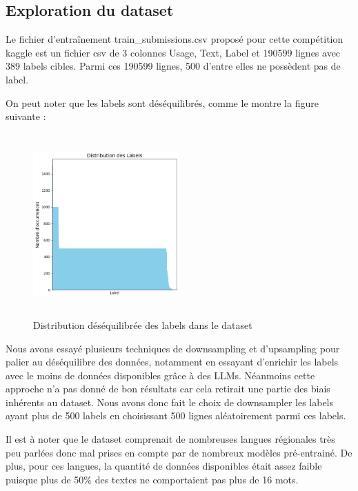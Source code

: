 \subsection{Exploration du dataset}

Le fichier d'entraînement train\_submissions.csv proposé pour cette compétition kaggle est un fichier csv de 3 colonnes Usage, Text, Label et 190599 lignes avec 389 labels cibles. Parmi ces 190599 lignes, 500 d'entre elles ne possèdent pas de label. 

On peut noter que les labels sont déséquilibrés, comme le montre la figure suivante :

\begin{figure}[h!]
    \centering
    \includegraphics[width=0.5\textwidth, height=7cm]{img/unbalance.png}
    \caption{Distribution déséquilibrée des labels dans le dataset}
    \label{fig:unbalance}
\end{figure}

Nous avons essayé plusieurs techniques de downsampling et d'upsampling pour palier au déséquilibre des données, notamment en essayant d'enrichir les labels avec le moins de données disponibles grâce à des LLMs. Néanmoins cette approche n'a pas donné de bon résultats car cela retirait une partie des biais inhérents au dataset. Nous avons donc fait le choix de downsampler les labels ayant plus de 500 labels en choisissant 500 lignes aléatoirement parmi ces labels.

Il est à noter que le dataset comprenait de nombreuses langues régionales très peu parlées donc mal prises en compte par de nombreux modèles pré-entrainé. De plus, pour ces langues, la quantité de données disponibles était assez faible puisque plus de 50\% des textes ne comportaient pas plus de 16 mots. 

